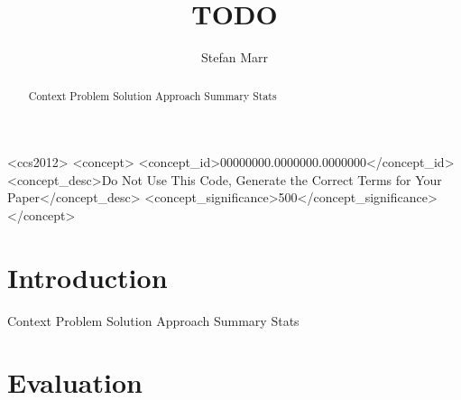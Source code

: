 \documentclass[acmsmall,screen]{acmart}
\begin{document}
\title{TODO}

\author{Stefan Marr}


\begin{abstract}
\begin{note}
  Context
  Problem
  Solution Approach
  Summary Stats
\end{note}
\end{abstract}

\begin{CCSXML}
<ccs2012>
 <concept>
  <concept_id>00000000.0000000.0000000</concept_id>
  <concept_desc>Do Not Use This Code, Generate the Correct Terms for Your Paper</concept_desc>
  <concept_significance>500</concept_significance>
 </concept>
\end{CCSXML}




\maketitle

\section{Introduction}
\begin{note}
  Context
  Problem
  Solution Approach
  Summary Stats
\end{note}




\section{Evaluation}

\end{document}
